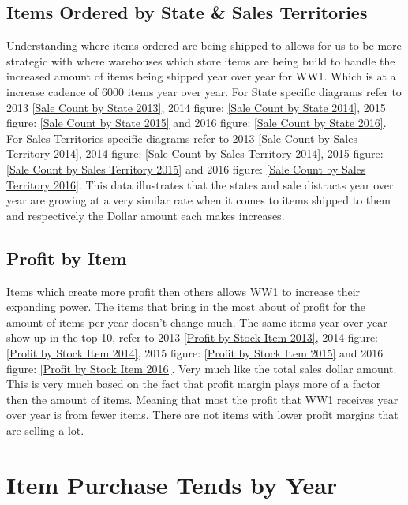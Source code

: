 \documentclass[12pt]{article}
\begin{document}
\subsection{Items Ordered by State \& Sales Territories}
\begin{flushleft}
Understanding where items ordered are being shipped to allows for us to be more strategic with where warehouses which store items are being build to handle the increased amount of items being shipped year over year for WW1. Which is at a increase cadence of 6000 items year over year. For State specific diagrams refer to 2013 \ref{Sale Count by State 2013}, 2014 figure: \ref{Sale Count by State 2014}, 2015 figure: \ref{Sale Count by State 2015} and 2016 figure: \ref{Sale Count by State 2016}. For Sales Territories specific diagrams refer to 2013 \ref{Sale Count by Sales Territory 2014}, 2014 figure: \ref{Sale Count by Sales Territory 2014}, 2015 figure: \ref{Sale Count by Sales Territory 2015} and 2016 figure: \ref{Sale Count by Sales Territory 2016}. This data illustrates that the states and sale distracts year over year are growing at a very similar rate when it comes to items shipped to them and respectively the Dollar amount each makes increases.

\end{flushleft}


\subsection{Profit by Item}
\begin{flushleft}
Items which create more profit then others allows WW1 to increase their expanding power. The items that bring in the most about of profit for the amount of items per year doesn't change much. The same items year over year show up in the top 10, refer to 2013 \ref{Profit by Stock Item 2013}, 2014 figure: \ref{Profit by Stock Item 2014}, 2015 figure: \ref{Profit by Stock Item 2015} and 2016 figure: \ref{Profit by Stock Item 2016}. Very much like the total sales dollar amount. This is very much based on the fact that profit margin plays more of a factor then the amount of items. Meaning that most the profit that WW1 receives year over year is from fewer items. There are not items with lower profit margins that are selling a lot.

\end{flushleft}
\newpage
\section{Item Purchase Tends by Year}
\end{document}
